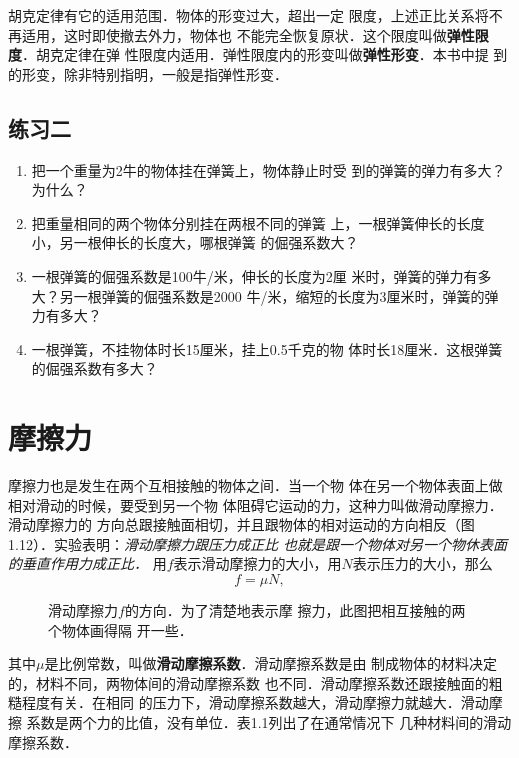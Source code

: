     胡克定律有它的适用范围．物体的形变过大，超出一定
限度，上述正比关系将不再适用，这时即使撤去外力，物体也
不能完全恢复原状．这个限度叫做\textbf{弹性限度}．胡克定律在弹
性限度内适用．弹性限度内的形变叫做\textbf{弹性形变}．本书中提
到的形变，除非特别指明，一般是指弹性形变．

\subsection*{练习二}
\begin{enumerate}
\item 把一个重量为2牛的物体挂在弹簧上，物体静止时受
到的弹簧的弹力有多大？为什么？
\item 把重量相同的两个物体分别挂在两根不同的弹簧
上，一根弹簧伸长的长度小，另一根伸长的长度大，哪根弹簧
的倔强系数大？
\item 一根弹簧的倔强系数是100牛/米，伸长的长度为2厘
米时，弹簧的弹力有多大？另一根弹簧的倔强系数是2000
牛/米，缩短的长度为3厘米时，弹簧的弹力有多大？
\item 一根弹簧，不挂物体时长15厘米，挂上0.5千克的物
体时长18厘米．这根弹簧的倔强系数有多大？
\end{enumerate}

\section{摩擦力}
    摩擦力也是发生在两个互相接触的物体之间．当一个物
体在另一个物体表面上做相对滑动的时候，要受到另一个物
体阻碍它运动的力，这种力叫做滑动摩擦力．滑动摩擦力的
方向总跟接触面相切，并且跟物体的相对运动的方向相反（图
1.12）．实验表明：\textit{滑动摩擦力跟压力成正比
也就是跟一个物体对另一个物休表面的垂直作用力成正比．}
用$f$表示滑动摩擦力的大小，用$N$表示压力的大小，那么
\[f=\mu N,\]
\begin{figure}[htp]\centering
{}
\caption{滑动摩擦力$f$的方向．为了清楚地表示摩
擦力，此图把相互接触的两个物体画得隔
开一些．
}
\end{figure}
其中$\mu$是比例常数，叫做\textbf{滑动摩擦系数}．滑动摩擦系数是由
制成物体的材料决定的，材料不同，两物体间的滑动摩擦系数
也不同．滑动摩擦系数还跟接触面的粗糙程度有关．在相同
的压力下，滑动摩擦系数越大，滑动摩擦力就越大．滑动摩擦
系数是两个力的比值，没有单位．表1.1列出了在通常情况下
几种材料间的滑动摩擦系数．

